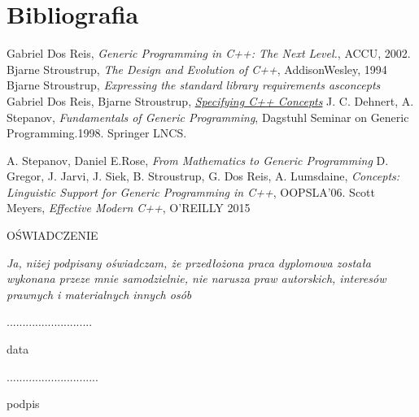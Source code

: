 \documentclass[11pt, a4paper]{article}
\begin{document}
	\newpage
	
	\section{Bibliografia}
	\begin{thebibliography}{6}
	
	 Gabriel Dos Reis, \emph{Generic Programming in C++: The Next Level.}, ACCU, 2002.
	 Bjarne Stroustrup, \emph{The Design and Evolution of C++}, AddisonWesley, 1994
	  Bjarne Stroustrup, \emph{Expressing the standard library requirements asconcepts}	
	 Gabriel Dos Reis, Bjarne Stroustrup, \href{http://www.stroustrup.com/popl06.pdf}{\emph{Specifying C++ Concepts}}
	 J. C. Dehnert, A. Stepanov, \emph{Fundamentals of Generic Programming}, Dagstuhl Seminar on Generic Programming.1998. Springer LNCS.

	 A. Stepanov, Daniel E.Rose, \emph{From Mathematics to Generic Programming}
	 D. Gregor, J. Jarvi, J. Siek, B. Stroustrup, G. Dos Reis, A. Lumsdaine, \emph{Concepts: Linguistic Support for Generic Programming in C++}, OOPSLA’06.
	 Scott Meyers, \emph{Effective Modern C++}, O'REILLY 2015
	\end{thebibliography}
	\newpage
	\begin{center}
	OŚWIADCZENIE	
	\end{center}
	
	\emph{Ja, niżej podpisany oświadczam, że przedłożona praca dyplomowa została wykonana przeze mnie samodzielnie, nie narusza praw autorskich, interesów prawnych i materialnych innych osób}\newline\newline
	
	\begin{minipage}[t]{7cm}
	\flushleft
	\noindent \textsc{...........................}

	data
	\end{minipage}
	\hfill
	\begin{minipage}[t]{7cm}
	\flushright
	\textsc{.............................}

	podpis
	\end{minipage}
\end{document}
